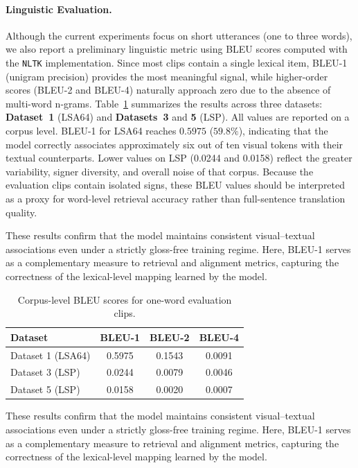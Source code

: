 \documentclass[runningheads]{llncs}
\begin{document}
\paragraph{Linguistic Evaluation.}
Although the current experiments focus on short utterances (one to three words), we also report a preliminary linguistic metric using BLEU scores computed with the \texttt{NLTK} implementation.
Since most clips contain a single lexical item, BLEU-1 (unigram precision) provides the most meaningful signal, while higher-order scores (BLEU-2 and BLEU-4) naturally approach zero due to the absence of multi-word n-grams.
Table~\ref{tab:bleu} summarizes the results across three datasets: \textbf{Dataset~1} (LSA64) and \textbf{Datasets~3} and \textbf{5} (LSP).
All values are reported on a corpus level. BLEU-1 for LSA64 reaches $0.5975$ ($59.8\%$), indicating that the model correctly associates approximately six out of ten visual tokens with their textual counterparts.
Lower values on LSP (0.0244 and 0.0158) reflect the greater variability, signer diversity, and overall noise of that corpus.
Because the evaluation clips contain isolated signs, these BLEU values should be interpreted as a proxy for word-level retrieval accuracy rather than full-sentence translation quality.

\noindent These results confirm that the model maintains consistent visual–textual associations even under a strictly gloss-free training regime. Here, BLEU-1 serves as a complementary measure to retrieval and alignment metrics, capturing the correctness of the lexical-level mapping learned by the model.

\begin{table}[t]
\centering
\caption{Corpus-level BLEU scores for one-word evaluation clips.}
\label{tab:bleu}
\begin{tabular}{lccc}
\toprule
\textbf{Dataset} & \textbf{BLEU-1} & \textbf{BLEU-2} & \textbf{BLEU-4}\\
\midrule
Dataset 1 (LSA64) & 0.5975 & 0.1543 & 0.0091\\
Dataset 3 (LSP)   & 0.0244 & 0.0079 & 0.0046\\
Dataset 5 (LSP)   & 0.0158 & 0.0020 & 0.0007\\
\bottomrule
\end{tabular}
\end{table}

\FloatBarrier
\noindent These results confirm that the model maintains consistent visual–textual associations even under a strictly gloss-free training regime. Here, BLEU-1 serves as a complementary measure to retrieval and alignment metrics, capturing the correctness of the lexical-level mapping learned by the model.
\end{document}
